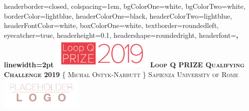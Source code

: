 \documentclass[landscape,a0paper,fontscale=0.285]{baposter} %
\begin{document}
\begin{poster}
{
headerborder=closed, %
colspacing=1em, %
bgColorOne=white, %
bgColorTwo=white, %
borderColor=lightblue, %
headerColorOne=black, %
headerColorTwo=lightblue, %
headerFontColor=white, %
boxColorOne=white, %
textborder=roundedleft, %
eyecatcher=true, %
headerheight=0.1\textheight, %
headershape=roundedright, %
headerfont=\Large\bf\textsc, %
linewidth=2pt %
}
%
{\includegraphics[height=4em]{loopq.png}} %
{\bf\textsc{Loop Q PRIZE Qualifying Challenge 2019}\vspace{0.5em}} %
{\textsc{\{ Michal Ostyk-Narbutt \} \hspace{12pt} Sapienza University of Rome}} %
{\includegraphics[height=4em]{logo.png}} %



\end{poster}
\end{document}
